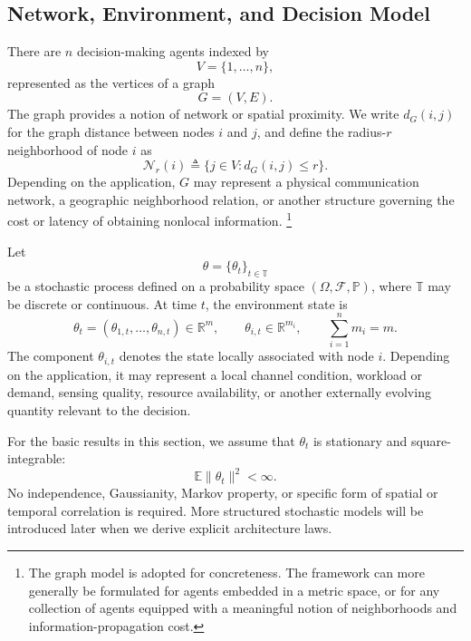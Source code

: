 \documentclass[11pt]{article}
\begin{document}
\subsection{Network, Environment, and Decision Model}
\label{subsec:decision_model}

There are $n$ decision-making agents indexed by
\[
    V=\{1,\ldots,n\},
\]
represented as the vertices of a graph
\begin{equation}
    G=(V,E).
    \label{eq:network_graph}
\end{equation}
The graph provides a notion of network or spatial proximity. We write
$d_G(i,j)$ for the graph distance between nodes $i$ and $j$, and define the
radius-$r$ neighborhood of node $i$ as
\begin{equation}
    \mathcal{N}_r(i)
    \triangleq
    \{j\in V:d_G(i,j)\le r\}.
    \label{eq:r_neighborhood}
\end{equation}
Depending on the application, $G$ may represent a physical communication
network, a geographic neighborhood relation, or another structure governing
the cost or latency of obtaining nonlocal information.
\footnote{The graph model is adopted for concreteness. The framework can more
generally be formulated for agents embedded in a metric space, or for any
collection of agents equipped with a meaningful notion of neighborhoods and
information-propagation cost.}

Let
\[
    \theta=\{\theta_t\}_{t\in\mathbb{T}}
\]
be a stochastic process defined on a probability space
$(\Omega,\mathcal{F},\mathbb{P})$, where $\mathbb{T}$ may be discrete or
continuous. At time $t$, the environment state is
\begin{equation}
    \theta_t
    =
    \left(
        \theta_{1,t},\ldots,\theta_{n,t}
    \right)
    \in\mathbb{R}^{m},
    \qquad
    \theta_{i,t}\in\mathbb{R}^{m_i},
    \qquad
    \sum_{i=1}^{n}m_i=m .
    \label{eq:state_partition}
\end{equation}
The component $\theta_{i,t}$ denotes the state locally associated with node
$i$. Depending on the application, it may represent a local channel
condition, workload or demand, sensing quality, resource availability, or
another externally evolving quantity relevant to the decision.

For the basic results in this section, we assume that $\theta_t$ is stationary
and square-integrable:
\begin{equation}
    \mathbb{E}\|\theta_t\|^2<\infty.
    \label{eq:state_integrability}
\end{equation}
No independence, Gaussianity, Markov property, or specific form of spatial or
temporal correlation is required. More structured stochastic models will be
introduced later when we derive explicit architecture laws.
\end{document}
